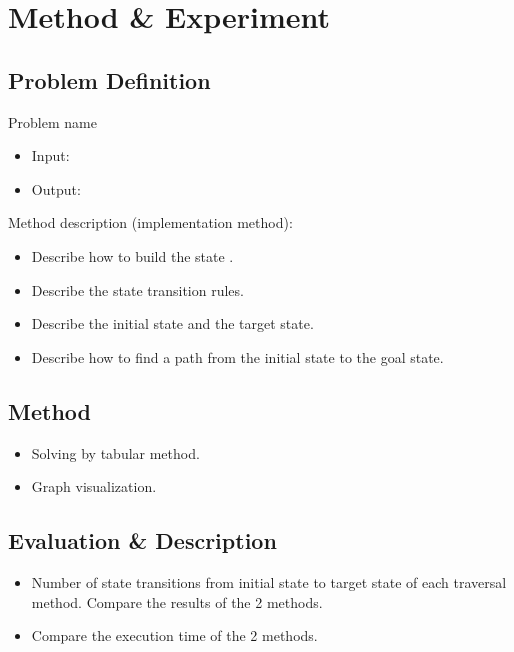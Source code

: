 \section{Method \& Experiment}
\subsection{Problem Definition}
Problem name \cite{Russell-Norvig2021}
\begin{itemize}
    \item Input:
    \item Output:
\end{itemize}

Method description (implementation method):
\begin{itemize}
    \item Describe how to build the state \cite{einstein1905}.
    \item Describe the state transition rules.
    \item Describe the initial state and the target state.
    \item Describe how to find a path from the initial state to the goal state.
\end{itemize}

\subsection{Method}
\begin{itemize}
    \item Solving by tabular method.
    \item Graph visualization.
\end{itemize}

\subsection{Evaluation \& Description}
\begin{itemize}
    \item Number of state transitions from initial state to target state of each traversal method. Compare the results of the 2 methods.
    \item Compare the execution time of the 2 methods.
\end{itemize}